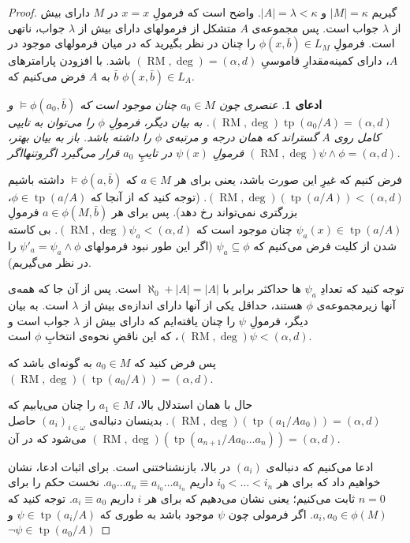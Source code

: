 \documentclass[12pt,a4paper]{report}
\theoremstyle{colorhead}
\newtheorem{claim}[thm]{ادعای}
\DeclareMathOperator{\RM}{RM}
\DeclareMathOperator{\tp}{tp}
\begin{document}
\begin{proof}
گیریم
$|M|=\kappa$
و
$|A|=\lambda<\kappa$.
واضح است که فرمولِ
$x=x$
در
$M$
دارای بیش از
$\lambda$
جواب است.
پس مجموعه‌ی
$A$
متشکل از فرمولهای دارای بیش از 
$\lambda$
جواب، ناتهی است. 
 فرمولِ
$\phi(x,\bar{b})\in L_M$
را چنان در نظر بگیرید که 
در میان فرمولهای
موجود در
$A$،
 دارای کمینه‌مقدارِ قاموسیِ
$(\RM,\deg)=(\alpha,d)$
باشد. با افزودن پارامترهای
$\bar{b}$
به 
$A$
فرض می‌کنیم که 
$\phi(x,\bar{b})\in L_A$.
\begin{claim}
عنصری چون
$a_0\in M$
چنان موجود است که 
$\models \phi(a_0,\bar{b})$
و
\mbox{$(\RM,\deg)\tp(a_0/A)=(\alpha,d)$}.
به بیان دیگر، فرمولِ
$\phi$
را می‌توان به تایپی کامل روی
$A$
گستراند که همان درجه‌ و مرتبه‌ی 
$\phi$
را داشته باشد. باز به بیان بهتر،‌
فرمولِ
$\psi(x)$
در تایپِ
$a_0$
قرار می‌گیرد اگروتنهااگر
$(\RM,\deg)\psi\wedge\phi=(\alpha,d)$.
\end{claim}
فرض کنیم که غیرِ این صورت باشد، یعنی برای هر
$a\in M$
که
$\models \phi(a,\bar{b})$
داشته باشیم
$(\RM,\deg)(\tp(a/A))<(\alpha,d)$.
(توجه کنید که از آنجا که
$\phi\in \tp(a/A)$،
بزرگتری نمی‌تواند رخ دهد).
پس برای هر
$a\in \phi(M,\bar{b})$
فرمولِ
$\psi_a(x)\in \tp(a/A)$
چنان موجود است که 
\mbox{$(\RM,\deg)\psi_a<(\alpha,d)$}.
بی‌ کاسته شدن از کلیت فرض می‌کنیم
که 
$\psi_a\subseteq \phi$
(اگر این طور نبود فرمولهای
$\psi'_a=\psi_a\wedge\phi$
را در نظر می‌گیریم).
\par 
توجه کنید که تعدادِ
$\psi_a$
ها حداکثر برابر با
$\aleph_0+|A|=|A|$
است.
پس از آن جا که همه‌ی آنها زیرمجموعه‌ی
$\phi$
هستند،  حداقل یکی از آنها دارای اندازه‌ی بیش
از
$\lambda$
است. 
به بیان دیگر، فرمولِ
$\psi$
را چنان یافته‌ایم که
دارای بیش از
$\lambda$
جواب است و 
\mbox{$(\RM,\deg) \psi<(\alpha,d)$}، 
که این ناقضِ
نحوه‌ی انتخابِ
$\phi$
است.
\par 
 پس فرض کنید که 
$a_0\in M$
به گونه‌ای باشد که
$(\RM,\deg)(\tp(a_0/A))=(\alpha,d)$.
\par 
حال با همان استدلال بالا، 
$a_1\in M$
را چنان می‌یابیم که 
$(\RM,\deg )(\tp(a_1/Aa_0))=(\alpha,d)$.
بدینسان دنباله‌ی
$(a_i)_{i\in \omega}$
حاصل می‌شود که در آن
$(\RM,\deg)(\tp(a_{n+1}/Aa_0\ldots a_n))=(\alpha,d)$.
\par 
ادعا می‌کنیم که دنباله‌ی
$(a_i)$
در بالا، بازنشناختنی است. برای اثبات ادعا، نشان خواهیم داد که برای هر
$i_0<\ldots <i_n$
داریم
$a_0\ldots a_n\equiv a_{i_0}\ldots a_{i_n}$.
نخست حکم را برای 
\mbox{$n=0$}
ثابت می‌کنیم؛ یعنی نشان می‌دهیم که برای هر
$i$
داریم
$a_i\equiv a_0$.
توجه کنید که
$a_i,a_0\in \phi(M)$.
اگر فرمولی چون
$\psi$
موجود باشد به طوری که
$\psi\in \tp(a_i/A)$
و
$\neg \psi\in \tp(a_0/A)$

\end{proof}
\end{document}
